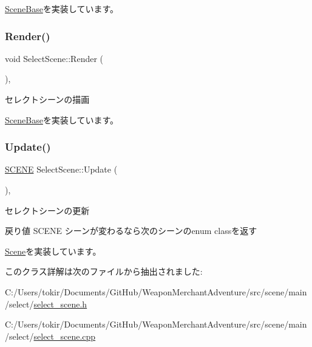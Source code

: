 \mbox{\hyperlink{class_scene_base_a24d7db43c819924dc8b07b436f6d3148}{Scene\+Base}}を実装しています。

\mbox{\label{class_select_scene_a85445536ad84d5232c724ecb7d48b8aa}} 
\subsubsection{\texorpdfstring{Render()}{Render()}}
{\footnotesize\ttfamily void Select\+Scene\+::\+Render (\begin{DoxyParamCaption}{ }\end{DoxyParamCaption})\hspace{0.3cm}{\ttfamily [final]}, {\ttfamily [virtual]}}



セレクトシーンの描画 



\mbox{\hyperlink{class_scene_base_ad981674ce731ea267f398e889bbb9dc3}{Scene\+Base}}を実装しています。

\mbox{\label{class_select_scene_a963eef40b6cae9667a66c5a517b66ab8}} 
\subsubsection{\texorpdfstring{Update()}{Update()}}
{\footnotesize\ttfamily \mbox{\hyperlink{scene__base_8h_a24cee5343fb9d0706ead6e8601f363be}{S\+C\+E\+NE}} Select\+Scene\+::\+Update (\begin{DoxyParamCaption}{ }\end{DoxyParamCaption})\hspace{0.3cm}{\ttfamily [final]}, {\ttfamily [virtual]}}



セレクトシーンの更新 

\begin{DoxyReturn}{戻り値}
S\+C\+E\+NE シーンが変わるなら次のシーンのenum classを返す 
\end{DoxyReturn}


\mbox{\hyperlink{class_scene_acb50f8104e5a7cfecbdececa7d5f1b39}{Scene}}を実装しています。



このクラス詳解は次のファイルから抽出されました\+:\begin{DoxyCompactItemize}
\item 
C\+:/\+Users/tokir/\+Documents/\+Git\+Hub/\+Weapon\+Merchant\+Adventure/src/scene/main/select/\mbox{\hyperlink{select__scene_8h}{select\+\_\+scene.\+h}}\item 
C\+:/\+Users/tokir/\+Documents/\+Git\+Hub/\+Weapon\+Merchant\+Adventure/src/scene/main/select/\mbox{\hyperlink{select__scene_8cpp}{select\+\_\+scene.\+cpp}}\end{DoxyCompactItemize}
